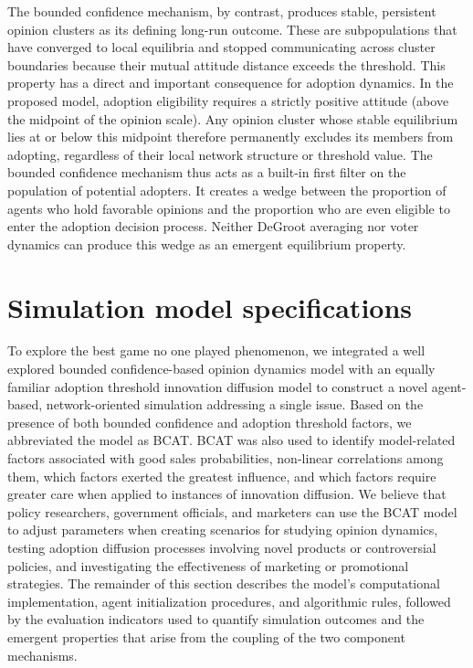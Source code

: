 \documentclass[10pt,letterpaper]{article}
\begin{document}
The bounded confidence mechanism, by contrast, produces stable, persistent opinion clusters as its defining long-run outcome. These are subpopulations that have converged to local equilibria and stopped communicating across cluster boundaries because their mutual attitude distance exceeds the threshold. This property has a direct and important consequence for adoption dynamics. In the proposed model, adoption eligibility requires a strictly positive attitude (above the midpoint of the opinion scale). Any opinion cluster whose stable equilibrium lies at or below this midpoint therefore permanently excludes its members from adopting, regardless of their local network structure or threshold value. The bounded confidence mechanism thus acts as a built-in first filter on the population of potential adopters. It creates a wedge between the proportion of agents who hold favorable opinions and the proportion who are even eligible to enter the adoption decision process. Neither DeGroot averaging nor voter dynamics can produce this wedge as an emergent equilibrium property.


\section*{Simulation model specifications}

To explore the best game no one played phenomenon, we integrated a well explored bounded confidence-based opinion dynamics model with an equally familiar adoption threshold innovation diffusion model to construct a novel agent-based, network-oriented simulation addressing a single issue. Based on the presence of both bounded confidence and adoption threshold factors, we abbreviated the model as BCAT. BCAT was also used to identify model-related factors associated with good sales probabilities, non-linear correlations among them, which factors exerted the greatest influence, and which factors require greater care when applied to instances of innovation diffusion. We believe that policy researchers, government officials, and marketers can use the BCAT model to adjust parameters when creating scenarios for studying opinion dynamics, testing adoption diffusion processes involving novel products or controversial policies, and investigating the effectiveness of marketing or promotional strategies. The remainder of this section describes the model's computational implementation, agent initialization procedures, and algorithmic rules, followed by the evaluation indicators used to quantify simulation outcomes and the emergent properties that arise from the coupling of the two component mechanisms.
\end{document}
